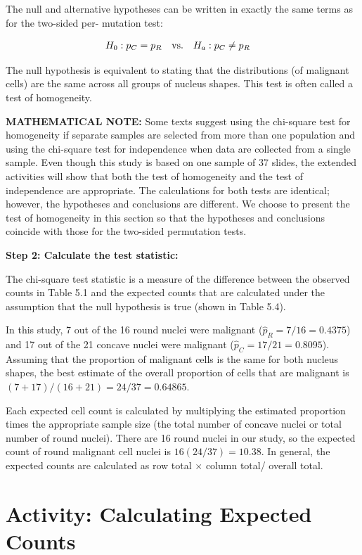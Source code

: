 \documentclass[
]{report}
\begin{document}
The null and alternative hypotheses can be written in exactly the same terms as for the two-sided per-
mutation test:

\begin{align}
H_0: p_C &= p_R \quad\text{vs.}\quad H_a: p_C \neq p_R 
\notag
\end{align}

The null hypothesis is equivalent to stating that the distributions (of malignant cells) are the same
across all groups of nucleus shapes. This test is often called a test of homogeneity.

\large

\textbf{MATHEMATICAL NOTE:}
Some texts suggest using the chi-square test for homogeneity if separate samples are selected from
more than one population and using the chi-square test for independence when data are collected from
a single sample. Even though this study is based on one sample of 37 slides, the extended activities will
show that both the test of homogeneity and the test of independence are appropriate. The calculations
for both tests are identical; however, the hypotheses and conclusions are different. We choose to present
the test of homogeneity in this section so that the hypotheses and conclusions coincide with those for the
two-sided permutation tests.
\normalsize

\textbf{Step 2: Calculate the test statistic:}

The chi-square test statistic is a measure of the difference between the observed counts in Table 5.1
and the expected counts that are calculated under the assumption that the null hypothesis is true (shown
in Table 5.4).

In this study, 7 out of the 16 round nuclei were malignant (\(\hat p_R = 7/16= 0.4375\)) and 17 out of the
21 concave nuclei were malignant (\(\hat p_C = 17/21= 0.8095\)). Assuming that the proportion of malignant
cells is the same for both nucleus shapes, the best estimate of the overall proportion of cells that are
malignant is \((7 + 17)/(16 + 21)= 24/37= 0.64865\).

Each expected cell count is calculated by multiplying the estimated proportion times the
­appropriate sample size (the total number of concave nuclei or total number of round nuclei).
There are 16 round nuclei in our study, so the expected count of round malignant cell nuclei is
\(16(24/37)= 10.38\). In general, the expected counts are calculated as row total \(\times\) column total/
overall total.

\hypertarget{activity-calculating-expected-counts}{%
\section*{Activity: Calculating Expected Counts}\label{activity-calculating-expected-counts}}
\end{document}
